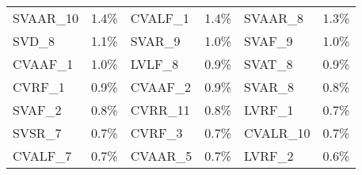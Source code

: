 \begin{center}
\begin{longtable}{m{1.5cm}<{\centering}m{2cm}<{\centering}m{2cm}<{\centering}m{2cm}<{\centering}m{2cm}<{\centering}m{2cm}<{\centering}}
            \cellcolor{pink}SVAAR\_10                        & \cellcolor{pink}1.4\%                            & \cellcolor{cyan}CVALF\_1                         & \cellcolor{cyan}1.4\%                            & \cellcolor{pink}SVAAR\_8                         & \cellcolor{pink}1.3\%                            \\
            SVD\_8                                           & 1.1\%                                            & \cellcolor{pink}SVAR\_9                          & \cellcolor{pink}1.0\%                            & \cellcolor{cyan}SVAF\_9                          & \cellcolor{cyan}1.0\%                            \\
            \cellcolor{cyan}CVAAF\_1                         & \cellcolor{cyan}1.0\%                            & \cellcolor{cyan}LVLF\_8                          & \cellcolor{cyan}0.9\%                            & SVAT\_8                          & 0.9\%                            \\
            \cellcolor{cyan}CVRF\_1                          & \cellcolor{cyan}0.9\%                            & \cellcolor{cyan}CVAAF\_2                         & \cellcolor{cyan}0.9\%                            & \cellcolor{pink}SVAR\_8                          & \cellcolor{pink}0.8\%                            \\
            \cellcolor{cyan}SVAF\_2                          & \cellcolor{cyan}0.8\%                            & \cellcolor{pink}CVRR\_11                         & \cellcolor{pink}0.8\%                            & \cellcolor{cyan}LVRF\_1                          & \cellcolor{cyan}0.7\%                            \\
            \cellcolor{pink}SVSR\_7                          & \cellcolor{pink}0.7\%                            & \cellcolor{cyan}CVRF\_3                          & \cellcolor{cyan}0.7\%                            & \cellcolor{pink}CVALR\_10                        & \cellcolor{pink}0.7\%                            \\
            \cellcolor{cyan}CVALF\_7                         & \cellcolor{cyan}0.7\%                            & \cellcolor{pink}CVAAR\_5                         & \cellcolor{pink}0.7\%                            & \cellcolor{cyan}LVRF\_2                          & \cellcolor{cyan}0.6\%                           
      \end{longtable}
\end{center}
\vspace{-0.8cm}

